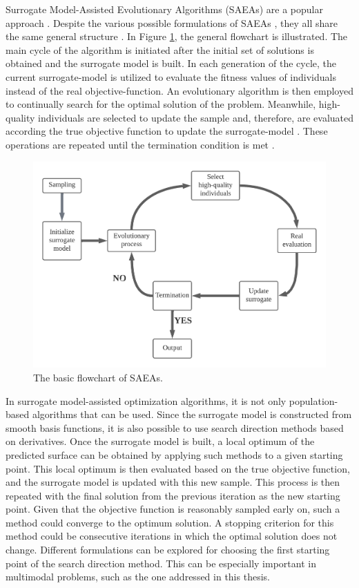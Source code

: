 			Surrogate Model-Assisted Evolutionary Algorithms (SAEAs) are a popular approach  \citep{emmerich2006single,liu2014gaussian}. Despite the various possible formulations of SAEAs \citep{buche2005accelerating}, they all share the same general structure \citep{he2023review}. In Figure \ref{fig:proposed-methodology:surrogate:algorithms:saeaflowchart}, the general flowchart is illustrated. The main cycle of the algorithm is initiated after the initial set of solutions is obtained and the surrogate model is built. In each generation of the cycle, the current surrogate-model is utilized to evaluate the fitness values of individuals instead of the real objective-function. An evolutionary algorithm is then employed to continually search for the optimal solution of the problem. Meanwhile, high-quality individuals are selected to update the sample and, therefore, are evaluated according the true objective function to update the surrogate-model \citep{zhou2007combining,liu2014gaussian,sun2017surrogate}. These operations are repeated until the termination condition is met \citep{jin2005comprehensive}.
			
			\begin{figure}[!h]
				\centering
				\includegraphics[width=.8\textwidth]{./figuras/saeaflowchart}
				\caption[The basic flowchart of SAEAs.]{The basic flowchart of SAEAs.}
				\label{fig:proposed-methodology:surrogate:algorithms:saeaflowchart}
			\end{figure}
			
			In surrogate model-assisted optimization algorithms, it is not only population-based algorithms that can be used. Since the surrogate model is constructed from smooth basis functions, it is also possible to use search direction methods based on derivatives. Once the surrogate model is built, a local optimum of the predicted surface can be obtained by applying such methods to a given starting point. This local optimum is then evaluated based on the true objective function, and the surrogate model is updated with this new sample. This process is then repeated with the final solution from the previous iteration as the new starting point. Given that the objective function is reasonably sampled early on, such a method could converge to the optimum solution. A stopping criterion for this method could be consecutive iterations in which the optimal solution does not change. Different formulations can be explored for choosing the first starting point of the search direction method. This can be especially important in multimodal problems, such as the one addressed in this thesis.
		
